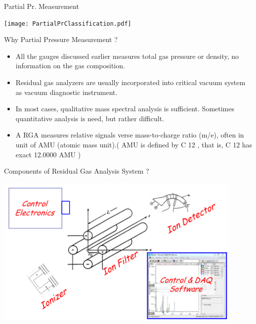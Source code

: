 \documentclass[11pt]{beamer}
\begin{document}
		
\begin{frame}{Partial Pr. Measurement}

		\begin{center}
			\texttt{[image: PartialPrClassification.pdf]}
		\end{center} 


\end{frame}


\begin{frame}{Why Partial Pressure Measurement ?}

		\begin{itemize}
		\item All the gauges discussed earlier measures total gas pressure or density, no information on the gas composition.
        \item Residual gas analyzers are usually incorporated into critical vacuum system as vacuum diagnostic instrument.
        \item In most cases, qualitative mass spectral analysis is sufficient. Sometimes quantitative analysis is need, but
rather difficult.
		\item A RGA measures relative signals verse mass-to-charge ratio (m/e), often in unit of AMU (atomic mass unit).( AMU is defined by C 12 , that is, C 12 has exact 12.0000 AMU )
		\end{itemize}


\end{frame}


\begin{frame}{Components of Residual Gas Analysis System ?}

	\begin{center}
			\includegraphics[width=0.9\textwidth]{ResGasAna.png}
		\end{center} 	


\end{frame}
\end{document}
